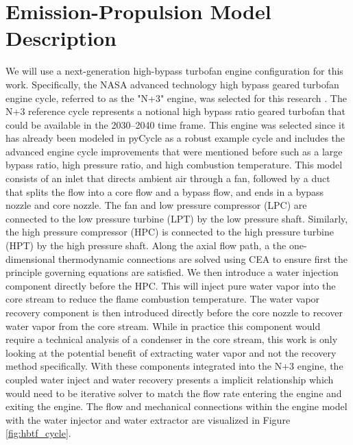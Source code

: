 \documentclass[]{icas2022}
\begin{document}
\section{Emission-Propulsion Model Description}
\label{sec:epModel}
We will use a next-generation high-bypass turbofan engine configuration for this work.
Specifically, the NASA advanced technology high bypass geared turbofan engine cycle, referred to as the "N+3" engine, was selected for this research \cite{Hendricks2019}. The N+3 reference cycle represents a notional high bypass ratio geared turbofan that could be available in the 2030–2040 time frame. 
This engine was selected since it has already been modeled in pyCycle as a robust example cycle and includes the advanced engine cycle improvements that were mentioned before such as a large bypass ratio, high pressure ratio, and high combustion temperature. 
This model consists of an inlet that directs ambient air through a fan, followed by a duct that splits the flow into a core flow and a bypass flow, and ends in a bypass nozzle and core nozzle. The fan and low pressure compressor (LPC) are connected to the low pressure turbine (LPT) by the low pressure shaft. 
Similarly, the high pressure compressor (HPC) is connected to the high pressure turbine (HPT) by the high pressure shaft. Along the axial flow path, a the one-dimensional thermodynamic connections are solved using CEA to ensure first the principle governing equations are satisfied. 
We then introduce a water injection component directly before the HPC. 
This will inject pure water vapor into the core stream to reduce the flame combustion temperature. 
The water vapor recovery component is then introduced directly before the core nozzle to recover water vapor from the core stream. 
While in practice this component would require a technical analysis of a condenser in the core stream, this work is only looking at the potential benefit of extracting water vapor and not the recovery method specifically. 
With these components integrated into the N+3 engine, the coupled water inject and water recovery presents a implicit relationship which would need to be iterative solver to match the flow rate entering the engine and exiting the engine. 
The flow and mechanical connections within the engine model with the water injector and water extractor are visualized in Figure \ref{fig:hbtf_cycle}.
\end{document}

